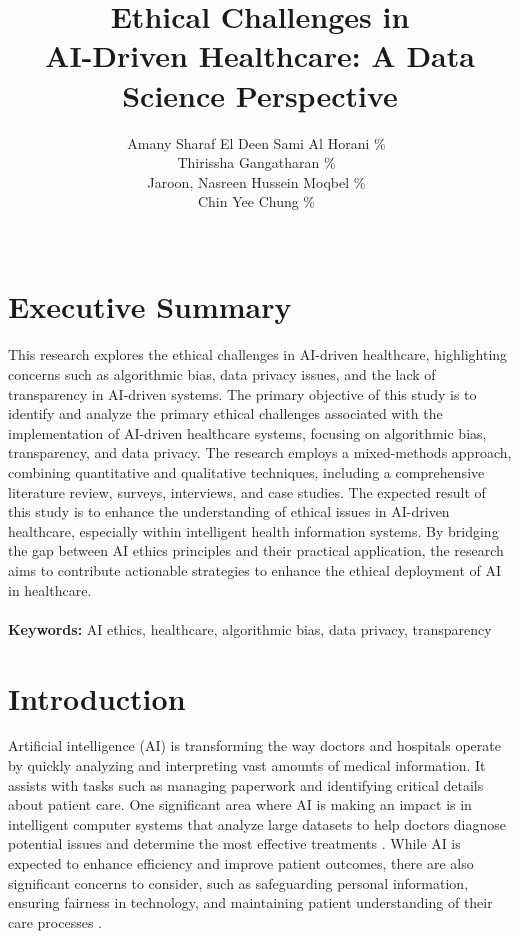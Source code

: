 \documentclass[a4paper, 12pt]{article}
\author{
Amany Sharaf El Deen Sami Al Horani \quad 1221305230 \quad 25\%\ \\
Thirissha Gangatharan \quad 1211106376 \quad 25\%\ \\
Jaroon, Nasreen Hussein Moqbel \quad 1211105750 \quad 25\%\ \\
Chin Yee Chung \quad 1211111435 \quad 25\%\ \\\\
}
\title{ Ethical Challenges in \\
AI-Driven Healthcare: A Data Science Perspective
  }
\begin{document}
\maketitle

\section*{Executive Summary}
This research explores the ethical challenges in AI-driven healthcare, highlighting concerns such as algorithmic bias, data privacy issues, and the lack of transparency in AI-driven systems. The primary objective of this study is to identify and analyze the primary ethical challenges associated with the implementation of AI-driven healthcare systems, focusing on algorithmic bias, transparency, and data privacy. The research employs a mixed-methods approach, combining quantitative and qualitative techniques, including a comprehensive literature review, surveys, interviews, and case studies. The expected result of this study is to enhance the understanding of ethical issues in AI-driven healthcare, especially within intelligent health information systems. By bridging the gap between AI ethics principles and their practical application, the research aims to contribute actionable strategies to enhance the ethical deployment of AI in healthcare.
\hfill
\\\\
\textbf{Keywords:} AI ethics, healthcare, algorithmic bias, data privacy, transparency \\

\pagebreak
\tableofcontents
\pagebreak

\section{Introduction} 
Artificial intelligence (AI) is transforming the way doctors and hospitals operate by quickly analyzing and interpreting vast amounts of medical information. It assists with tasks such as managing paperwork and identifying critical details about patient care. One significant area where AI is making an impact is in intelligent computer systems that analyze large datasets to help doctors diagnose potential issues and determine the most effective treatments \cite{Gujral2020}. While AI is expected to enhance efficiency and improve patient outcomes, there are also significant concerns to consider, such as safeguarding personal information, ensuring fairness in technology, and maintaining patient understanding of their care processes \cite{Fatima2024}.\\
\end{document}
